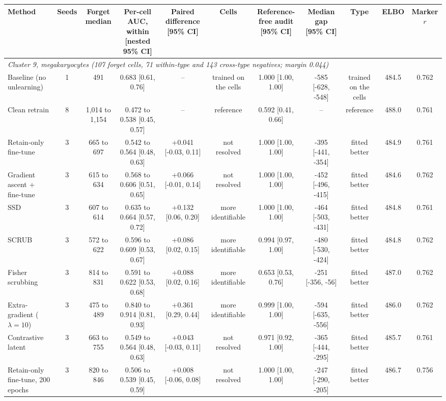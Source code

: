 \begin{tabular}{lcccccccccc}
\toprule
Method & Seeds & Forget median & Per-cell AUC, within [nested 95\% CI] & Paired difference [95\% CI] & Cells & Reference-free audit [95\% CI] & Median gap [95\% CI] & Type & ELBO & Marker $r$ \\
\midrule
\multicolumn{11}{l}{\emph{Cluster 9, megakaryocytes (107 forget cells, 71 within-type and 143 cross-type negatives; margin 0.044)}} \\
Baseline (no unlearning) & 1 & 491 & 0.683 [0.61, 0.76] & -- & trained on the cells & 1.000 [1.00, 1.00] & -585 [-628, -548] & trained on the cells & 484.5 & 0.762 \\
Clean retrain & 8 & 1,014 to 1,154 & 0.472 to 0.538 [0.45, 0.57] & -- & reference & 0.592 [0.41, 0.66] & -- & reference & 488.0 & 0.761 \\
\midrule
Retain-only fine-tune & 3 & 665 to 697 & 0.542 to 0.564 [0.48, 0.63] & +0.041 [-0.03, 0.11] & not resolved & 1.000 [1.00, 1.00] & -395 [-441, -354] & fitted better & 484.9 & 0.761 \\
Gradient ascent + fine-tune & 3 & 615 to 634 & 0.568 to 0.606 [0.51, 0.65] & +0.066 [-0.01, 0.14] & not resolved & 1.000 [1.00, 1.00] & -452 [-496, -415] & fitted better & 484.6 & 0.762 \\
SSD & 3 & 607 to 614 & 0.635 to 0.664 [0.57, 0.72] & +0.132 [0.06, 0.20] & more identifiable & 1.000 [1.00, 1.00] & -464 [-503, -431] & fitted better & 484.8 & 0.761 \\
SCRUB & 3 & 572 to 622 & 0.596 to 0.609 [0.53, 0.67] & +0.086 [0.02, 0.15] & more identifiable & 0.994 [0.97, 1.00] & -480 [-530, -424] & fitted better & 484.8 & 0.762 \\
Fisher scrubbing & 3 & 814 to 831 & 0.591 to 0.622 [0.53, 0.68] & +0.088 [0.02, 0.16] & more identifiable & 0.653 [0.53, 0.76] & -251 [-356, -56] & fitted better & 487.0 & 0.762 \\
Extra-gradient ($\lambda=10$) & 3 & 475 to 489 & 0.840 to 0.914 [0.81, 0.93] & +0.361 [0.29, 0.44] & more identifiable & 0.999 [1.00, 1.00] & -594 [-635, -556] & fitted better & 486.0 & 0.762 \\
Contrastive latent & 3 & 663 to 755 & 0.549 to 0.564 [0.48, 0.63] & +0.043 [-0.03, 0.11] & not resolved & 0.971 [0.92, 1.00] & -365 [-444, -295] & fitted better & 485.7 & 0.761 \\
Retain-only fine-tune, 200 epochs & 3 & 820 to 846 & 0.506 to 0.539 [0.45, 0.59] & +0.008 [-0.06, 0.08] & not resolved & 1.000 [1.00, 1.00] & -247 [-290, -205] & fitted better & 486.7 & 0.756 \\

\end{tabular}

